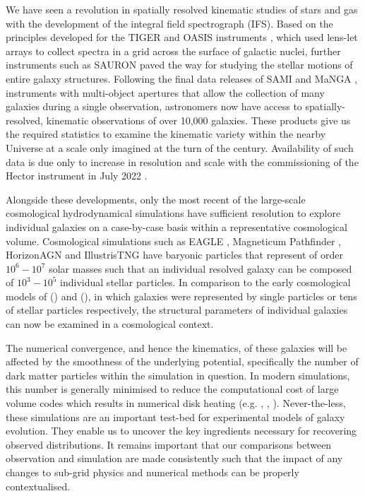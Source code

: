 \documentclass[
  journal=pasa,
  manuscript=research-paper, %
  year=2020,
  volume=37,
]{cup-journal}
\newcommand{\citetoggle}[1]{\citeauthor{#1} (\citeyear{#1})}
\newcommand{\citetoggleinbracket}[1]{\citeauthor{#1} \citeyear{#1}}
\begin{document}
We have seen a revolution in spatially resolved kinematic studies of stars and gas with the development of the integral field spectrograph (IFS). Based on the principles developed for the \textsc{TIGER} and \textsc{OASIS} instruments \citep{Bacon19953DTIGER., Bacon2017OpticalAstronomy}, which used lens-let arrays to collect spectra in a grid across the surface of galactic nuclei, further instruments such as \textsc{SAURON} \citep{Bacon2001TheSpectrograph} paved the way for studying the stellar motions of entire galaxy structures. 
Following the final data releases of SAMI \citep{Croom2021TheTransitions} and MaNGA \citep{Bundy2015OverviewObservatory, Abdurrouf2022TheData}, instruments with multi-object apertures that allow the collection of many galaxies during a single observation, astronomers now have access to spatially-resolved, kinematic observations of over 10,000 galaxies.
These products give us the required statistics to examine the kinematic variety within the nearby Universe at a scale only imagined at the turn of the century.
Availability of such data is due only to increase in resolution and scale with the commissioning of the Hector instrument in July 2022 \citep{Bryant2020HectorTelescope}.

Alongside these developments, only the most recent of the large-scale cosmological hydrodynamical simulations have sufficient resolution to explore individual galaxies on a case-by-case basis within a representative cosmological volume.
Cosmological simulations such as EAGLE \citep{Schaye2015TheEnvironments, Crain2015TheVariations}, Magneticum Pathfinder \citep{Teklu2015ConnectingMorphology, Schulze2018KinematicsRedshifts}, HorizonAGN \citep{Dubois2014DancingWeb} and IllustrisTNG \citep{Pillepich2018SimulatingModel, Springel2018FirstClustering, Nelson2019Firstfeedback} have baryonic particles that represent of order $10^{6} - 10^{7}$ solar masses such that an individual resolved galaxy can be composed of $10^{3} - 10^{5}$ individual stellar particles. 
In comparison to the early cosmological models of \citetoggle{Metzler1994Agalaxies} and \citetoggle{Katz1996CosmologicalTreeSPH}, in which galaxies were represented by single particles or tens of stellar particles respectively, the structural parameters of individual galaxies can now be examined in a cosmological context.

The numerical convergence, and hence the kinematics, of these galaxies will be affected by the smoothness of the underlying potential, specifically the number of dark matter particles within the simulation in question. In modern simulations, this number is generally minimised to reduce the computational cost of large volume codes which results in numerical disk heating (e.g. \citetoggleinbracket{Ludlow2019NumericalHaloes}, \citetoggleinbracket{Ludlow2021SpuriousParticles}, \citetoggleinbracket{Wilkinson2023SpuriousHeating}). 
Never-the-less, these simulations are an important test-bed for experimental models of galaxy evolution.
They enable us to uncover the key ingredients necessary for recovering observed distributions.
It remains important that our comparisons between observation and simulation are made consistently such that the impact of any changes to sub-grid physics and numerical methods can be properly contextualised. 
\end{document}
